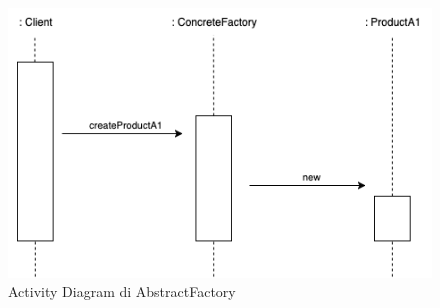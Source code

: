 \begin{figure}[H]
    \centering
    \includegraphics[width=1\linewidth]{assets/pattern/abstract-factory/abstract-factory-activity.drawio.png}
    \caption{Activity Diagram di AbstractFactory}
\end{figure}

\newpage